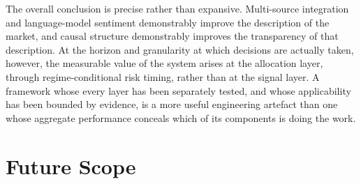 The overall conclusion is precise rather than expansive. Multi-source integration and
language-model sentiment demonstrably improve the description of the market, and causal
structure demonstrably improves the transparency of that description. At the horizon and
granularity at which decisions are actually taken, however, the measurable value of the
system arises at the allocation layer, through regime-conditional risk timing, rather than
at the signal layer. A framework whose every layer has been separately tested, and whose
applicability has been bounded by evidence, is a more useful engineering artefact than one
whose aggregate performance conceals which of its components is doing the work.

\section{Future Scope}

